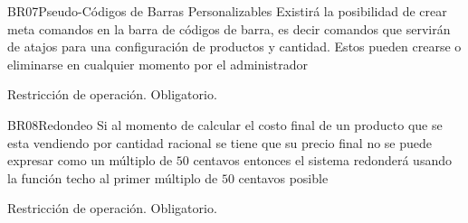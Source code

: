 	\begin{BussinesRule}{BR07}{Pseudo-Códigos de Barras Personalizables}
		\BRitem[Descripción:] 
		Existirá la posibilidad de crear meta comandos en la barra de códigos de barra, es decir
		comandos que servirán de atajos para una configuración de productos y cantidad. Estos pueden
		crearse o eliminarse en cualquier momento por el administrador

		\BRitem[Tipo:] Restricción de operación.
		\BRitem[Nivel:] Obligatorio.
	\end{BussinesRule}

	\begin{BussinesRule}{BR08}{Redondeo}
		\BRitem[Descripción:] 
		Si al momento de calcular el costo final de un producto que se esta vendiendo por cantidad racional
		se tiene que su precio final no se puede expresar como un múltiplo de $50$ centavos entonces
		el sistema redonderá usando la función techo al primer múltiplo de $50$ centavos posible

		\BRitem[Tipo:] Restricción de operación.
		\BRitem[Nivel:] Obligatorio.
	\end{BussinesRule}


